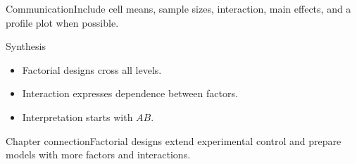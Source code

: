 \documentclass[10pt,aspectratio=169]{beamer}
\begin{document}
\begin{frame}{Communication}\small Include cell means, sample sizes, interaction, main effects, and a profile plot when possible.\end{frame}
\begin{frame}{Synthesis}\small\begin{itemize}\item Factorial designs cross all levels.\item Interaction expresses dependence between factors.\item Interpretation starts with $AB$.\end{itemize}\end{frame}
\begin{frame}{Chapter connection}\small Factorial designs extend experimental control and prepare models with more factors and interactions.\end{frame}
\end{document}
